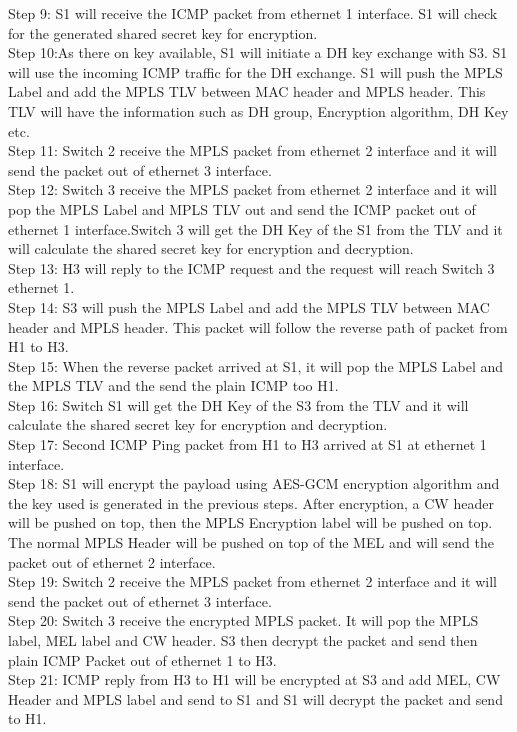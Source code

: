 Step 9: S1 will receive the ICMP packet from ethernet 1 interface. S1 will check for the generated shared secret key for encryption.\\
Step 10:As there on key available, S1 will initiate a DH key exchange with S3. S1 will use the incoming ICMP traffic for the DH exchange. S1 will push the MPLS Label and add the MPLS TLV          between MAC header and MPLS header. This TLV will have the information such as DH group, Encryption algorithm, DH Key etc.\\
Step 11: Switch 2 receive the MPLS packet from ethernet 2 interface and it will send the packet out of ethernet 3 interface.\\
Step 12: Switch 3 receive the MPLS packet from ethernet 2 interface and it will pop the MPLS Label and MPLS TLV out and send the ICMP packet out of ethernet 1 interface.Switch 3 will get the DH Key of the S1 from the TLV and it will calculate the shared secret key for encryption and decryption.\\
Step 13: H3 will reply to the ICMP request and the request will reach Switch 3 ethernet 1.\\
Step 14: S3 will push the MPLS Label and add the MPLS TLV between MAC header and MPLS header. This packet will follow the reverse path of packet from H1 to H3.\\
Step 15: When the reverse packet arrived at S1, it will pop the MPLS Label and the MPLS TLV and the send the plain ICMP too H1.\\
Step 16: Switch S1 will get the DH Key of the S3 from the TLV and it will calculate the shared secret key for encryption and decryption.\\
Step 17: Second ICMP Ping packet from H1 to H3 arrived at S1 at ethernet 1 interface.\\
Step 18: S1 will encrypt the payload using  AES-GCM encryption algorithm and the key used is generated in the previous steps. After encryption, a CW header will be pushed on top, then the MPLS Encryption label will be pushed on top. The normal MPLS Header will be pushed on top of the MEL and will send the packet out of ethernet 2 interface.\\
Step 19: Switch 2 receive the MPLS packet from ethernet 2 interface and it will send the packet out of ethernet 3 interface.\\
Step 20: Switch 3 receive the encrypted MPLS packet. It will pop the MPLS label, MEL label and CW header. S3 then decrypt the packet and send then plain ICMP Packet out of ethernet 1 to H3.\\
Step 21: ICMP reply from H3 to H1 will be encrypted at S3 and add MEL, CW Header and MPLS label and send to S1 and S1 will decrypt the packet and send to H1.\\

